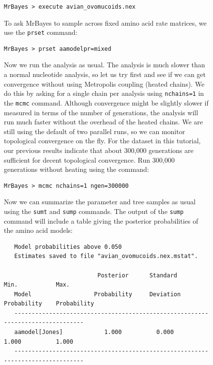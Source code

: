 \documentclass[12pt]{book}
\newcommand{\ttt}[1]{\texttt{#1}}
\begin{document}
\begin{figure}[h]
\begin{singlespacing}
\small
\begin{verbatim}
MrBayes > execute avian_ovomucoids.nex
\end{verbatim}
\normalsize
\end{singlespacing}

To ask MrBayes to sample across fixed amino acid rate matrices, we use the \ttt{prset} command:

\begin{singlespacing}
\small
\begin{verbatim}
MrBayes > prset aamodelpr=mixed
\end{verbatim}
\normalsize
\end{singlespacing}

Now we run the analysis as usual. The analysis is much slower than a normal nucleotide analysis, so
let us try first and see if we can get convergence without using Metropolis coupling (heated
chains). We do this by asking for a single chain per analysis using \ttt{nchains=1} in the
\ttt{mcmc} command. Although convergence might be slightly slower if measured in terms of the
number of generations, the analysis will run much faster without the overhead of the heated chains.
We are still using the default of two parallel runs, so we can monitor topological convergence on
the fly. For the dataset in this tutorial, our previous results indicate that about 300,000
generations are sufficient for decent topological convergence. Run 300,000 generations without
heating using the command:

\begin{singlespacing}
\small
\begin{verbatim}
MrBayes > mcmc nchains=1 ngen=300000
\end{verbatim}
\normalsize
\end{singlespacing}

Now we can summarize the parameter and tree samples as usual using the \ttt{sumt} and \ttt{sump}
commands. The output of the \ttt{sump} command will include a table giving the posterior
probabilities of the amino acid models:

\begin{singlespacing}
\scriptsize
\begin{verbatim}
   Model probabilities above 0.050
   Estimates saved to file "avian_ovomucoids.nex.mstat".

                           Posterior      Standard         Min.           Max.   
   Model                  Probability     Deviation     Probability    Probability
   -------------------------------------------------------------------------------
   aamodel[Jones]            1.000          0.000          1.000          1.000
   -------------------------------------------------------------------------------
\end{verbatim}
\normalsize
\end{singlespacing}


\end{figure}
\end{document}

